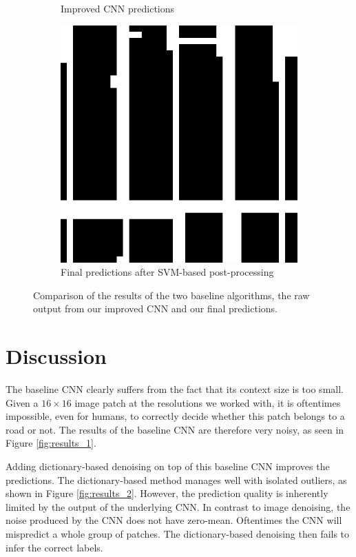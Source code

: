 \documentclass[10pt,conference,compsocconf]{IEEEtran}
\begin{document}
\begin{figure}
\begin{subfigure}[t]{.19\textwidth}
		\caption{Improved CNN predictions}
		\label{fig:results_3}
	\end{subfigure}		
	\begin{subfigure}[t]{.19\textwidth}
		\includegraphics[width=1\textwidth]{figs/results_comparison/post_pro_final_8}
		\caption{Final predictions after SVM-based post-processing}
		\label{fig:results_4}
	\end{subfigure}	
	\caption{Comparison of the results of the two baseline algorithms, the raw output from our improved CNN and our final predictions.}	
	\label{fig:resuls}
\end{figure}

\section{Discussion}
\label{sec:discussion}
The baseline CNN clearly suffers from the fact that its context size is too small. Given a $ 16 \times 16 $ image patch at the resolutions we worked with, it is oftentimes impossible, even for humans, to correctly decide whether this patch belongs to a road or not. The results of the baseline CNN are therefore very noisy, as seen in Figure \ref{fig:results_1}.

\par 
Adding dictionary-based denoising on top of this baseline CNN improves the predictions. The dictionary-based method manages well with isolated outliers, as shown in Figure \ref{fig:results_2}. However, the prediction quality is inherently limited by the output of the underlying CNN. In contrast to image denoising, the noise produced by the CNN does not have zero-mean. Oftentimes the CNN will mispredict a whole group of patches. The dictionary-based denoising then fails to infer the correct labels. 
\end{document}
